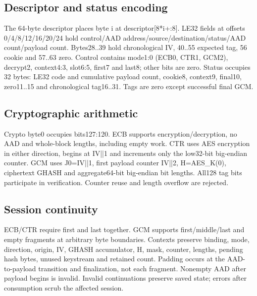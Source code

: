 \documentclass[11pt,a4paper]{article}
\begin{document}
\subsection{Descriptor and status encoding}

The 64-byte descriptor places byte i at descriptor[\allowbreak{}8*\allowbreak{}i+\allowbreak{}:8]\allowbreak{}. LE32 fields at offsets 0/\allowbreak{}4/\allowbreak{}8/\allowbreak{}12/\allowbreak{}16/\allowbreak{}20/\allowbreak{}24 hold control/\allowbreak{}AAD address/\allowbreak{}source/\allowbreak{}destination/\allowbreak{}status/\allowbreak{}AAD count/\allowbreak{}payload count. Bytes28..39 hold chronological IV,\allowbreak{} 40..55 expected tag,\allowbreak{} 56 cookie and 57..63 zero. Control contains mode1:0 (\allowbreak{}ECB0,\allowbreak{} CTR1,\allowbreak{} GCM2)\allowbreak{},\allowbreak{} decrypt2,\allowbreak{} context4:3,\allowbreak{} slot6:5,\allowbreak{} first7 and last8; other bits are zero. Status occupies 32 bytes: LE32 code and cumulative payload count,\allowbreak{} cookie8,\allowbreak{} context9,\allowbreak{} final10,\allowbreak{} zero11..15 and chronological tag16..31. Tags are zero except successful final GCM.

\subsection{Cryptographic arithmetic}

Crypto byte0 occupies bits127:120. ECB supports encryption/\allowbreak{}decryption,\allowbreak{} no AAD and whole-block lengths,\allowbreak{} including empty work. CTR uses AES encryption in either direction,\allowbreak{} begins at IV||1 and increments only the low32-bit big-endian counter. GCM uses J0=\allowbreak{}IV||1,\allowbreak{} first payload counter IV||2,\allowbreak{} H=\allowbreak{}AES\_\allowbreak{}K(\allowbreak{}0)\allowbreak{},\allowbreak{} ciphertext GHASH and aggregate64-bit big-endian bit lengths. All128 tag bits participate in verification. Counter reuse and length overflow are rejected.

\subsection{Session continuity}

ECB/\allowbreak{}CTR require first and last together. GCM supports first/\allowbreak{}middle/\allowbreak{}last and empty fragments at arbitrary byte boundaries. Contexts preserve binding,\allowbreak{} mode,\allowbreak{} direction,\allowbreak{} origin,\allowbreak{} IV,\allowbreak{} GHASH accumulator,\allowbreak{} H,\allowbreak{} mask,\allowbreak{} counter,\allowbreak{} lengths,\allowbreak{} pending hash bytes,\allowbreak{} unused keystream and retained count. Padding occurs at the AAD-to-payload transition and finalization,\allowbreak{} not each fragment. Nonempty AAD after payload begins is invalid. Invalid continuations preserve saved state; errors after consumption scrub the affected session.
\end{document}
